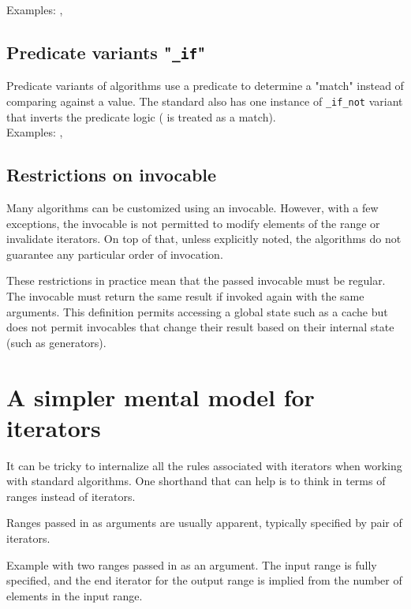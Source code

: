 \noindent Examples: , 

\subsection{Predicate variants "\texttt{\_if}"}

Predicate variants of algorithms use a predicate to determine a "match" instead of comparing against a value. The standard also has one instance of \texttt{\_if\_not} variant that inverts the predicate logic ( is treated as a match).\\

\noindent Examples: , 

\subsection{Restrictions on invocable}

Many algorithms can be customized using an invocable. However, with a few exceptions, the invocable is not permitted to modify elements of the range or invalidate iterators. On top of that, unless explicitly noted, the algorithms do not guarantee any particular order of invocation.

These restrictions in practice mean that the passed invocable must be regular. The invocable must return the same result if invoked again with the same arguments. This definition permits accessing a global state such as a cache but does not permit invocables that change their result based on their internal state (such as generators).

\section{A simpler mental model for iterators}

It can be tricky to internalize all the rules associated with iterators when working with standard algorithms. One shorthand that can help is to think in terms of ranges instead of iterators.

Ranges passed in as arguments are usually apparent, typically specified by pair of iterators.

\begin{box-note}
\footnotesize Example with two ranges passed in as an argument. The input range is fully specified, and the end iterator for the output range is implied from the number of elements in the input range.
\tcblower
{}
\end{box-note}

